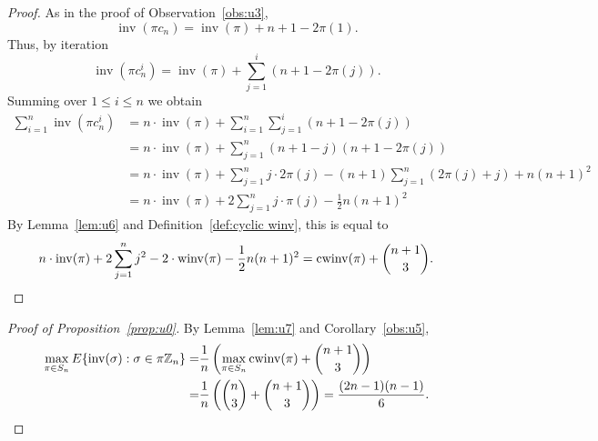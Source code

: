 \documentclass[11pt]{amsart}
\numberwithin{equation}{section}
\newcommand{\ZZ}{{\mathbb {Z}}}
\newcommand{\inv}{{\operatorname{inv}}}
\newcommand{\winv}{{\operatorname{winv}}}
\newcommand{\cwinv}{{\operatorname{cwinv}}}
\begin{document}
\begin{proof}
As in the proof of Observation~\ref{obs:u3},
\[
    \inv(\pi c_n) 
    = \inv(\pi) + n + 1 - 2\pi(1). 
\]
Thus, by iteration
\[
    \inv(\pi c_n^i)
    = \inv(\pi) + \sum_{j=1}^{i} (n + 1 - 2\pi(j)).
\]
Summing over $1\le i\le n$ we obtain
\begin{align*}
    \sum_{i=1}^n \inv(\pi c_n^i)
    &= n \cdot \inv(\pi) + \sum_{i=1}^n \sum_{j=1}^{i} (n + 1 - 2\pi(j)) \\
    &= n \cdot \inv(\pi) + \sum_{j=1}^{n}(n + 1 - j)(n + 1 - 2\pi(j)) \\
    &= n \cdot \inv(\pi) + \sum_{j=1}^{n} j \cdot 2\pi(j) - (n+1) \sum_{j=1}^{n} (2\pi(j) + j) + n(n+1)^2 \\
    &= n \cdot \inv(\pi) + 2\sum_{j=1}^{n} j \cdot \pi(j) - \frac{1}{2}n(n+1)^2
\end{align*}
By Lemma~\ref{lem:u6} and Definition~\ref{def:cyclic winv}, this is equal to
\[
    n \cdot \inv(\pi) + 2\sum_{j=1}^{n} j^2 - 2 \cdot \winv(\pi) - \frac{1}{2}n(n+1)^2
    = \cwinv(\pi)+\binom{n+1}{3}. \qedhere
\]
\end{proof}


\begin{proof}[Proof of Proposition~\ref{prop:u0}]
    By Lemma~\ref{lem:u7} and Corollary~\ref{obs:u5},  
    \begin{align*}
        \max_{\pi \in S_n} E\{ \inv(\sigma): \sigma \in  \pi \ZZ_n\}
    =& \frac{1}{n}\left(\max_{\pi\in S_n} \cwinv(\pi) + \binom{n+1}{3}\right)\\
    =& \frac{1}{n}\left( \binom{n}{3} + \binom{n+1}{3} \right)
    = \frac{(2n-1)(n-1)}{6}.   \qedhere 
\end{align*}
\end{proof}
\end{document}
